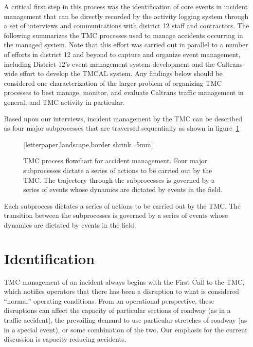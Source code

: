\documentclass[12pt]{report}
\begin{document}
A critical first step in this process was the identification of core events in
incident management that can be directly recorded by the activity logging system
through a set of interviews and communications with district 12 staff and
contractors.  The following summarizes the \ac{TMC} processes used to manage
accidents occurring in the managed system.  Note that this effort was carried
out in parallel to a number of efforts in district 12 and beyond to capture and
organize event management, including District 12's event management system
development and the Caltrans-wide effort to develop the \ac{TMCAL} system.  Any
findings below should be considered one characterization of the larger problem
of organizing \ac{TMC} processes to best manage, monitor, and evaluate Caltrans
traffic management in general, and \ac{TMC} activity in particular.

Based upon our interviews, incident management by the \ac{TMC} can be described
as four major subprocesses that are traversed sequentially as shown in
figure~\ref{fig:flowchart}
\begin{figure}
  [letterpaper,landscape,border shrink=5mm]
  \centering
  
  \caption[TMC process flowchart for accident management]{TMC process
    flowchart for accident management.  Four major subprocesses
    dictate a series of actions to be carried out by the TMC.  The
    trajectory through the subprocesses is governed by a series of
    events whose dynamics are dictated by events in the field.}
  \label{fig:flowchart}
\end{figure}
Each subprocess dictates a series of actions to be carried out by the \ac{TMC}.
The transition between the subprocesses is governed by a series of events whose
dynamics are dictated by events in the field.

\section{Identification}
\label{sec:identification}


\ac{TMC} management of an incident always begins with the {\sc First Call} to
the \ac{TMC}, which notifies operators that there has been a disruption to what
is considered ``normal'' operating conditions.  From an operational perspective,
these disruptions can affect the capacity of particular sections of roadway (as
in a traffic accident), the prevailing demand to use particular stretches of
roadway (as in a special event), or some combination of the two.  Our emphasis
for the current discussion is capacity-reducing accidents.
\end{document}
